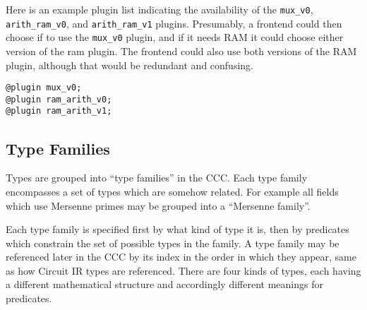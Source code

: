 Here is an example plugin list indicating the availability of the \verb|mux_v0|, \verb|arith_ram_v0|, and \verb|arith_ram_v1| plugins.
Presumably, a frontend could then choose if to use the \verb|mux_v0| plugin, and if it needs RAM it could choose either version of the ram plugin.
The frontend could also use both versions of the RAM plugin, although that would be redundant and confusing.

\begin{lstlisting}[language=ir]
@plugin mux_v0;
@plugin ram_arith_v0;
@plugin ram_arith_v1;
\end{lstlisting}

\subsection{Type Families}\label{sec:families}

Types are grouped into ``type families'' in the CCC.
Each type family encompasses a set of types which are somehow related.
For example all fields which use Mersenne primes may be grouped into a ``Mersenne family''.

Each type family is specified first by what kind of type it is, then by predicates which constrain the set of possible types in the family.
A type family may be referenced later in the CCC by its index in the order in which they appear, same as how Circuit IR types are referenced.
There are four kinds of types, each having a different mathematical structure and accordingly different meanings for predicates.

